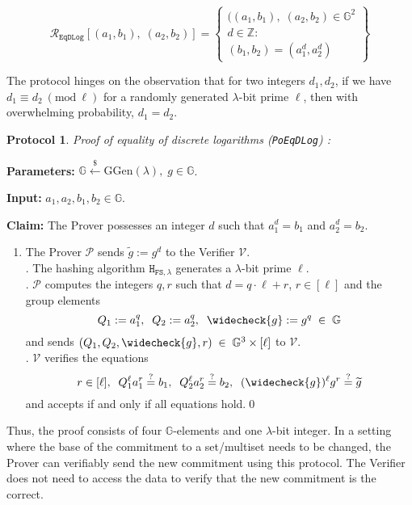 \documentclass[11pt, lettersize, notitlepage, leqno, footskip=0.6cm]{article}
\newcommand{\ttt}{\texttt}
\newcommand{\bg}{\mathbb{G}}
\newcommand{\bG}{\mathbb{G}}
\newcommand{\wti}{\widetilde}
\newcommand{\mc}{\mathcal}
\newcommand{\mb}{\mathbb}
\newcommand{\mr}{\mathrm}
\newcommand{\lam}{\lambda}
\newcommand{\lamb}{\lambda}
\newcommand{\weck}{\widecheck}
\newcommand{\vs}{\vspace{-0.15cm}}
\newcommand{\noin}{\noindent}
\newcommand{\op}{overwhelming probability}
\newcommand{\sta}{\stackrel{?}{=}}
\newcommand{\Mod}[1]{\ (\mathrm{mod}\ #1)}
\newtheorem{Prot}[Thm]{Protocol}
\numberwithin{equation}{section}
\begin{document}
\[
  \mc{R}_{\ttt{EqDLog}}[(a_1, b_1),\;(a_2,b_2)] = \left\{\begin{array}{l}
    ((a_1, b_1),\; (a_2,b_2)\in\mb{G}^2\\
    d\in\mb{Z}: \\
    (b_1,b_2) = (a_1^d,a_2^d)
  \end{array}\right\}
\] \vspace{0.1cm}

\noin The protocol hinges on the observation that for two integers $d_1,d_2$, if we have $d_1\equiv d_2\Mod{\ell}$ for a randomly generated $\lam$-bit prime $\ell$, then with \op, $d_1= d_2$.

\vspace{0.15cm}


\begin{Prot}\label{EqDLog} \normalfont \textit{Proof of equality of discrete logarithms} (\verb|PoEqDLog|) :\end{Prot} \vspace{-0.3cm}

\noin \textbf{Parameters:} $\mb{G}\xleftarrow{\$} \mr{GGen}(\lamb), \; g\in \mb{G}$.

\noin \textbf{Input:} $a_1, a_2, b_1, b_2 \in \mb{G}$.

\noin \textbf{Claim:} The Prover possesses an integer $d$ such that $a_1^d = b_1$ and $a_2^d = b_2$.

\begin{enumerate}[wide, labelwidth=!, labelindent=0pt]\vs \item The Prover $\mc{P}$ sends $\wti{g} := g^d$ to the Verifier $\mc{V}$.\\
\noin 2. The hashing algorithm $\ttt{H}_{\ttt{FS},\lam}$ generates a $\lamb$-bit prime $\ell$. \\
\noin 3. $\mc{P}$ computes the integers $q, r$ such that $d = q \cdot \ell+r$, $r\in [\ell]$ and the group elements \vs $$Q_1:= a_1^q,\;\; Q_2:= a_2^q,\;\; \weck{g}:= g^q\;\in\;\bG \vs $$ and sends $(Q_1, Q_2, \weck{g}, r)\;\in\; \bg^3\times [\ell]$ to $\mc{V}$. \\
\noin 4. $\mc{V}$ verifies the equations \vspace{-0.25cm} $$r\in [\ell],\;\;Q_1^{\ell}a_1^r \sta  b_1, \;\; Q_2^{\ell}a_2^r \sta  b_2, \;\; (\weck{g})^{\ell}g^r \sta \wti{g} \vs $$ and accepts if and only if all equations hold.\qed \end{enumerate}

\noin Thus, the proof consists of four $\mb{G}$-elements and one $\lam$-bit integer. In a setting where the base of the commitment to a set/multiset needs to be changed, the Prover can verifiably send the new commitment using this protocol. The Verifier does not need to access the data to verify that the new commitment is the correct. 
\end{document}
